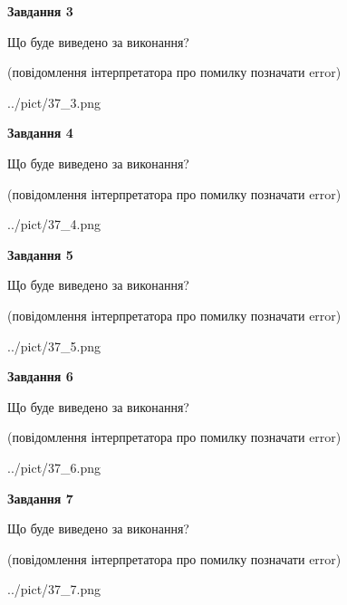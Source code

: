 \documentclass[12pt, ukrainian]{article}
\begin{document}
{\begin {large}
{\begin {center}\textbf{Завдання 3}\end {center}}\par
Що буде виведено за виконання?\par
 (повідомлення інтерпретатора про помилку позначати error)\par
\begin{center}
	{../pict/37_3.png}
\end{center}
\newpage

{\begin {center}\textbf{Завдання 4}\end {center}}\par
Що буде виведено за виконання?\par
 (повідомлення інтерпретатора про помилку позначати error)\par
\begin{center}
	{../pict/37_4.png}
\end{center}
\newpage

{\begin {center}\textbf{Завдання 5}\end {center}}\par
Що буде виведено за виконання?\par
 (повідомлення інтерпретатора про помилку позначати error)\par
\begin{center}
	{../pict/37_5.png}
\end{center}
\newpage

{\begin {center}\textbf{Завдання 6}\end {center}}\par
Що буде виведено за виконання?\par
 (повідомлення інтерпретатора про помилку позначати error)\par
\begin{center}
	{../pict/37_6.png}
\end{center}
\newpage

{\begin {center}\textbf{Завдання 7}\end {center}}\par
Що буде виведено за виконання?\par
 (повідомлення інтерпретатора про помилку позначати error)\par
\begin{center}
	{../pict/37_7.png}
\end{center}
\newpage


\end{large}}
\end{document}
